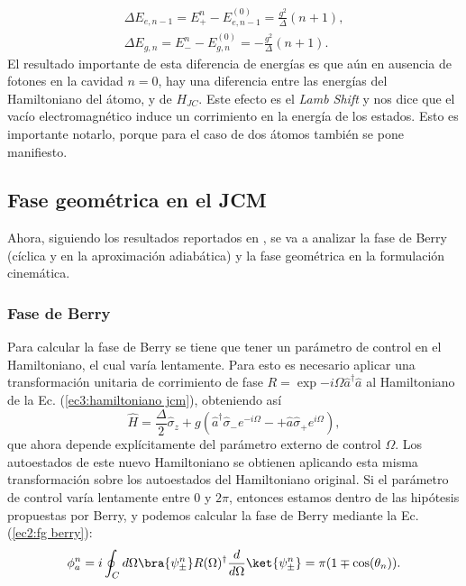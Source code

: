 \begin{equation}
    \begin{aligned}
        \Delta E_{e,n-1}=E_+^n-E^{(0)}_{e,n-1}=\frac{g^2}{\Delta}(n+1), \\
        \Delta E_{g,n}=E_-^n-E^{(0)}_{g,n}=-\frac{g^2}{\Delta}(n+1).
    \end{aligned}
\end{equation}
El resultado importante de esta diferencia de energías es que aún en ausencia de fotones en la cavidad $n=0$, hay una diferencia entre las energías del Hamiltoniano del átomo, y de $H_{JC}$. Este efecto es el \textit{Lamb Shift} y nos dice que el vac\'io electromagnético induce un corrimiento en la energ\'ia de los estados. Esto es importante notarlo, porque para el caso de dos átomos también se pone manifiesto.

\subsection{Fase geométrica en el JCM}
Ahora, siguiendo los resultados reportados en \cite{Viotti2022}, se va a analizar la fase de Berry (cíclica y en la aproximación adiabática) y la fase geométrica en la formulación cinemática.

\subsubsection{Fase de Berry}

Para calcular la fase de Berry se tiene que tener un parámetro de control en el Hamiltoniano, el cual varía lentamente. Para esto es necesario aplicar una transformación unitaria de corrimiento de fase $R=\exp{-i\Omega \hat a^\dagger \hat a}$ al Hamiltoniano de la Ec. (\ref{ec3:hamiltoniano jcm}), obteniendo así
\begin{equation}
    \hat H=\frac{\Delta}{2}\hat \sigma_z+g(\hat a^\dagger \hat \sigma_-e^{-i\Omega}-+\hat a\hat \sigma_+e^{i\Omega}),
\end{equation}
que ahora depende explícitamente del parámetro externo de control $\Omega$. Los autoestados de este nuevo Hamiltoniano se obtienen aplicando esta misma transformación sobre los autoestados del Hamiltoniano original. Si el parámetro de control varía lentamente entre 0 y $2\pi$, entonces estamos dentro de las hipótesis propuestas por Berry, y podemos calcular la fase de Berry mediante la Ec. (\ref{ec2:fg berry}):
\begin{equation}
    \phi_a^n=i\oint_Cd\Omega\bra{\psi_\pm^n}R(\Omega)^\dagger \frac{d}{d\Omega}\ket{\psi_\pm^n}=\pi(1\mp \cos(\theta_n)).
\end{equation}

